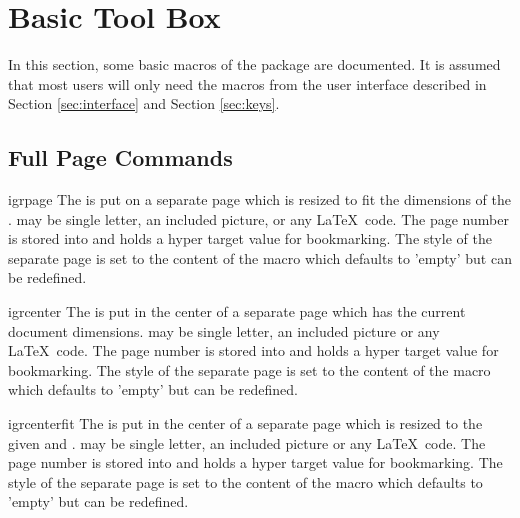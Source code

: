 \documentclass[a4paper,11pt]{ltxdoc}
\begin{document}
\section{Basic Tool Box}\label{sec:basictoolbox}
In this section, some basic macros of the package are documented.
It is assumed that most users will only need the macros from the
user interface described in Section \ref{sec:interface} and Section \ref{sec:keys}.


\subsection{Full Page Commands}

\begin{docCommand}{igrpage}{}
  The  is put on a separate page which is resized to fit the
  dimensions of the .  may be single letter, an
  included picture, or any \LaTeX\ code.
  The page number is stored into  and
   holds a hyper target value for bookmarking.
  The style of the separate page is set to
  the content of the macro
   which defaults to 'empty' but can be
  redefined.
\end{docCommand}

\begin{docCommand}{igrcenter}{}
  The  is put in the center of a separate page which has the
  current document dimensions.  may be single letter, an
  included picture or any \LaTeX\ code.
  The page number is stored into  and
   holds a hyper target value for bookmarking.
  The style of the separate page is set to
  the content of the macro
   which defaults to 'empty' but can be
  redefined.
\end{docCommand}

\begin{docCommand}{igrcenterfit}{}
  The  is put in the center of a separate page which
  is resized to the given  and .
   may be single letter, an
  included picture or any \LaTeX\ code.
  The page number is stored into  and
   holds a hyper target value for bookmarking.
  The style of the separate page is set to
  the content of the macro
   which defaults to 'empty' but can be
  redefined.
\end{docCommand}
\end{document}
